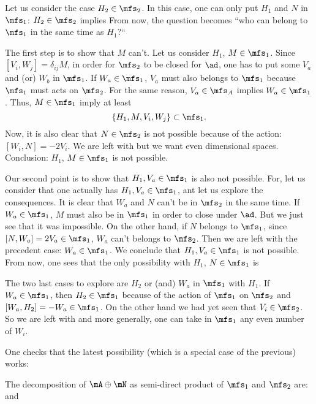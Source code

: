 Let us consider the case $H_2\in\mfs_2$. In this case, one can only put $H_1$ and $N$ in $\mfs_1$: $H_2\in\mfs_2$ implies
From now, the question becomes ``who can belong to $\mfs_1$ in the same time as $H_1$?``
 
The first step is to show that $M$ can't. Let us consider $H_1$, $M\in\mfs_1$. Since $[V_i,W_j]=\delta_{ij}M$, in order for $\mfs_2$ to be closed for $\ad$, one has to put some $V_a$ and (or) $W_b$ in $\mfs_1$. If $W_a\in\mfs_1$, $V_a$ must also belongs to $\mfs_1$ because $\mfs_1$ must acts on $\mfs_2$. For the same reason, $V_a\in\mfs_A$ implies $W_a\in\mfs_1$. Thus, $M\in\mfs_1$ imply at least
 \[
    \{H_1,M,V_i,W_j\}\subset \mfs_1.
 \]
Now, it is also clear that $N\in\mfs_2$ is not possible because of the action: $[W_i,N]=-2V_i$. We are left with
but we want even dimensional spaces. Conclusion: $H_1$, $M\in\mfs_1$ is not possible.

Our second point is to show that $H_1,V_a\in\mfs_1$ is also not possible. For, let us consider that one actually has $H_1,V_a\in\mfs_1$, ant let us explore the consequences. It is clear that $W_a$ and $N$ can't be in $\mfs_2$ in the same time. If $W_a\in\mfs_1$, $M$ must also be in $\mfs_1$ in order to close under $\ad$. But we just see that it was impossible. On the other hand, if $N$ belongs to $\mfs_1$, since $[N,W_a]=2V_a\in\mfs_1$, $W_a$ can't belongs to $\mfs_2$. Then we are left with the precedent case: $W_a\in\mfs_1$. We conclude that $H_1,V_a\in\mfs_1$ is not possible.
From now, one sees that the only possibility with $H_1$, $N\in\mfs_1$ is 

The two last cases to explore are $H_2$ or (and)  $W_a$ in $\mfs_1$ with $H_1$. If $W_a\in\mfs_1$, then $H_2\in\mfs_1$ because of the action of $\mfs_1$ on $\mfs_2$ and $[W_a,H_2]=-W_a\in\mfs_1$. On the other hand we had yet seen that $V_i\in\mfs_2$. So we are left with
and more generally, one can take in $\mfs_1$ any even number of $W_i$.

One checks that the latest possibility (which is a special case of the previous) works:

The decomposition of $\mA\oplus\mN$ as semi-direct product of $\mfs_1$ and $\mfs_2$ are:
and


